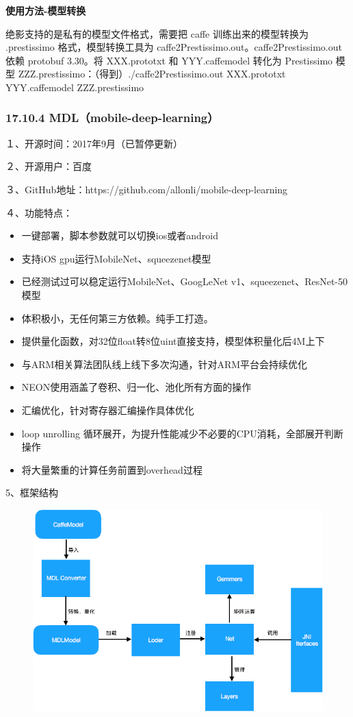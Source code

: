 \textbf{使用方法-模型转换}

绝影支持的是私有的模型文件格式，需要把 caffe 训练出来的模型转换为
.prestissimo 格式，模型转换工具为
caffe2Prestissimo.out。caffe2Prestissimo.out 依赖 protobuf 3.30。将
XXX.prototxt 和 YYY.caffemodel 转化为 Prestissimo 模型
ZZZ.prestissimo：（得到）./caffe2Prestissimo.out XXX.prototxt
YYY.caffemodel ZZZ.prestissimo

\subsubsection{17.10.4
MDL（mobile-deep-learning）}\label{mdlmobile-deep-learning}

１、开源时间：2017年9月（已暂停更新）　　　

２、开源用户：百度　　　　

３、GitHub地址：https://github.com/allonli/mobile-deep-learning

４、功能特点：

\begin{itemize}
\item
  一键部署，脚本参数就可以切换ios或者android
\item
  支持iOS gpu运行MobileNet、squeezenet模型
\item
  已经测试过可以稳定运行MobileNet、GoogLeNet
  v1、squeezenet、ResNet-50模型
\item
  体积极小，无任何第三方依赖。纯手工打造。
\item
  提供量化函数，对32位float转8位uint直接支持，模型体积量化后4M上下
\item
  与ARM相关算法团队线上线下多次沟通，针对ARM平台会持续优化
\item
  NEON使用涵盖了卷积、归一化、池化所有方面的操作
\item
  汇编优化，针对寄存器汇编操作具体优化
\item
  loop unrolling
  循环展开，为提升性能减少不必要的CPU消耗，全部展开判断操作
\item
  将大量繁重的计算任务前置到overhead过程
\end{itemize}

5、框架结构

\begin{figure}
\centering
\includegraphics{./img/ch17/MDL1.png}
\caption{}
\end{figure}

